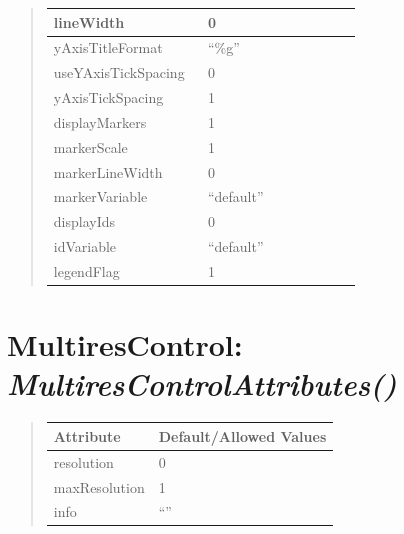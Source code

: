 \documentclass[letterpaper,10pt,english]{sphinxmanual}
\begin{document}
\begin{quote}
\begin{longtable}{|p{0.475\linewidth}|p{0.475\linewidth}|}
\\
\hline
lineWidth
 & 
0
\\
\hline
yAxisTitleFormat
 & 
``\%g''
\\
\hline
useYAxisTickSpacing
 & 
0
\\
\hline
yAxisTickSpacing
 & 
1
\\
\hline
displayMarkers
 & 
1
\\
\hline
markerScale
 & 
1
\\
\hline
markerLineWidth
 & 
0
\\
\hline
markerVariable
 & 
``default''
\\
\hline
displayIds
 & 
0
\\
\hline
idVariable
 & 
``default''
\\
\hline
legendFlag
 & 
1
\\
\hline\end{longtable}

\end{quote}

\begin{DUlineblock}{0em}
\item[] 
\end{DUlineblock}

\begin{DUlineblock}{0em}
\item[] 
\end{DUlineblock}


\section{\textbf{MultiresControl}: \emph{MultiresControlAttributes()}}
\label{attributes:multirescontrol-multirescontrolattributes}
\begin{DUlineblock}{0em}
\item[] 
\end{DUlineblock}
\begin{quote}

\begin{tabulary}{\linewidth}{|L|L|}
\hline

\textbf{Attribute}
 & 
\textbf{Default/Allowed Values}
\\
\hline
resolution
 & 
0
\\
\hline
maxResolution
 & 
1
\\
\hline
info
 & 
``''
\\
\hline\end{tabulary}

\end{quote}
\end{document}
